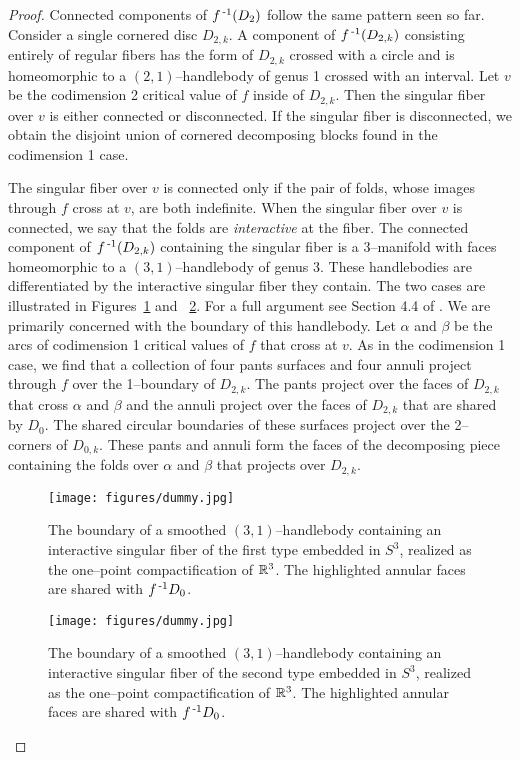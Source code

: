\begin{proof}
	Connected components of $f^{\,\text{-}1}(D_2)$ follow the same pattern seen so far.
	Consider a single cornered disc $D_{2,k}$.
	A component of $f^{\,\text{-}1}(D_{2,k})$ consisting entirely of regular fibers has the form of $D_{2,k}$ crossed with a circle and is homeomorphic to a $(2,1)$--handlebody of genus 1 crossed with an interval.
	Let $v$ be the codimension 2 critical value of $f$ inside of $D_{2,k}$.
	Then the singular fiber over $v$ is either connected or disconnected.
	If the singular fiber is disconnected, we obtain the disjoint union of cornered decomposing blocks found in the codimension 1 case.

	The singular fiber over $v$ is connected only if the pair of folds, whose images through $f$ cross at $v$, are both indefinite.
	When the singular fiber over $v$ is connected, we say that the folds are \emph{interactive} at the fiber.	
	The connected component of $f^{\,\text{-}1}(D_{2,k})$ containing the singular fiber is a 3--manifold with faces homeomorphic to a $(3,1)$--handlebody of genus 3.
	These handlebodies are differentiated by the interactive singular fiber they contain.
	The two cases are illustrated in Figures~\ref{fig:interactivefiber1} and ~\ref{fig:interactivefiber2}.
	For a full argument see Section 4.4 of \cite{CostThur08}.
	We are primarily concerned with the boundary of this handlebody.
	Let $\alpha$ and $\beta$ be the arcs of codimension 1 critical values of $f$ that cross at $v$.
	As in the codimension 1 case, we find that a collection of four pants surfaces and four annuli project through $f$ over the 1--boundary of $D_{2,k}$.
	The pants project over the faces of $D_{2,k}$ that cross $\alpha$ and $\beta$ and the annuli project over the faces of $D_{2,k}$ that are shared by $D_0$.
	The shared circular boundaries of these surfaces project over the 2--corners of $D_{0,k}$.
	These pants and annuli form the faces of the decomposing piece containing the folds over $\alpha$ and $\beta$ that projects over $D_{2,k}$.
	
	\begin{figure}
		\centering
		\caption{The boundary of a smoothed $(3,1)$--handlebody containing an interactive singular fiber of the first type embedded in $S^3$, realized as the one--point compactification of $\mathbb{R}^3$.  The highlighted annular faces are shared with $f^{\,\text{-}1} D_0$.}
		\texttt{[image: figures/dummy.jpg]}
		\label{fig:interactivefiber1}
	\end{figure}
	
	\begin{figure}
		\centering
		\caption{The boundary of a smoothed $(3,1)$--handlebody containing an interactive singular fiber of the second type embedded in $S^3$, realized as the one--point compactification of $\mathbb{R}^3$.  The highlighted annular faces are shared with $f^{\,\text{-}1} D_0$.}
		\texttt{[image: figures/dummy.jpg]}
		\label{fig:interactivefiber2}
	\end{figure}
	

\end{proof}

